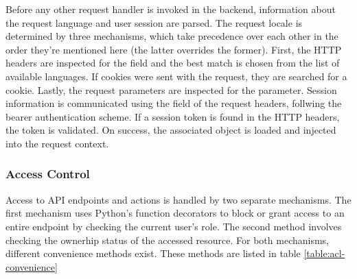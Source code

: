     Before any other request handler is invoked in the backend,
    information about the request language and user session are parsed.
    The request locale is determined by three mechanisms, which take
    precedence over each other in the order they're mentioned here
    (the latter overrides the former). First, the HTTP headers
    are inspected for the  field and the best
    match is chosen from the list of available languages.
    If cookies were sent with the request, they are searched for
    a  cookie. Lastly, the request parameters
    are inspected for the  parameter.
    Session information is communicated using the 
    field of the request headers, follwing the bearer authentication scheme.
    If a session token is found in the HTTP headers, the token is validated.
    On success, the associated  object is loaded and
    injected into the request context.    

    \subsubsection{Access Control}
        Access to API endpoints and actions is handled by two separate mechanisms.
        The first mechanism uses Python's function decorators to
        block or grant access to an entire endpoint by checking the
        current user's role. The second method involves checking the
        ownerhip status of the accessed resource. For both mechanisms,
        different convenience methods exist. These methods are listed in table 
        \ref{table:acl-convenience}

